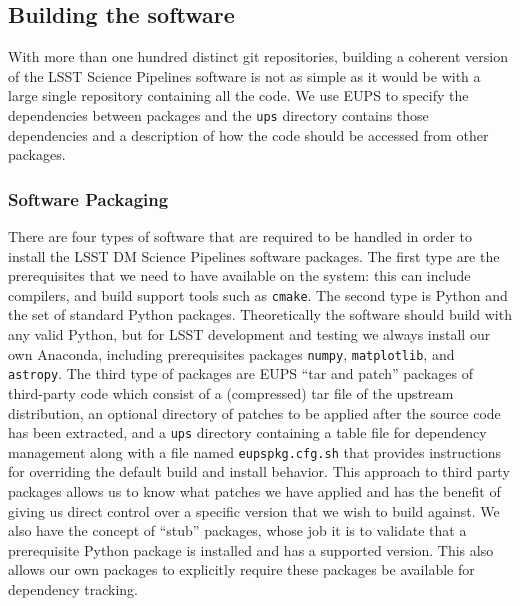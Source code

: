\subsection{Building the software}
\label{sec:buildsw}

With more than one hundred distinct git repositories, building a coherent version of the LSST Science Pipelines software is not as simple as it would be with a large single repository containing all the code.
We use EUPS to specify the dependencies between packages and the \texttt{ups} directory contains those dependencies and a description of how the code should be accessed from other packages.

\subsubsection{Software Packaging}

There are four types of software that are required to be handled in order to install the LSST DM Science Pipelines software packages.
The first type are the prerequisites that we need to have available on the system: this can include compilers, and build support tools such as \texttt{cmake}.
The second type is Python and the set of standard Python packages.
Theoretically the software should  build with any valid Python, but for LSST development and testing we always install our own Anaconda, including prerequisites packages \texttt{numpy}, \texttt{matplotlib}, and \texttt{astropy}\cite{2018arXiv180102634T}.
The third type of packages are EUPS ``tar and patch'' packages of third-party code
which  consist of a (compressed) tar file of the upstream distribution, an optional directory of patches to be applied after the source code has been extracted, and a \texttt{ups} directory containing a table file for dependency management along with a file named \texttt{eupspkg.cfg.sh} that provides instructions for overriding the default build and install behavior.
This approach to third party packages allows us to know what patches we have applied and has the benefit of giving us direct control over a specific version that we wish to build against.
We also have the concept of ``stub'' packages, whose job it is to validate that a prerequisite Python package is installed and has a supported version.
This also allows our own packages to explicitly require these packages be available for dependency tracking.

